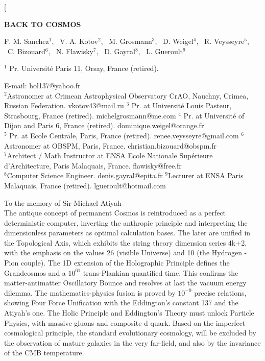 \documentclass[twoside,draft]{article}
\begin{document}
\begin{sloppypar}

\renewcommand{\refname}{References}
\renewcommand{\tablename}{\small Table}
\renewcommand{\figurename}{\small Fig.}
\renewcommand{\contentsname}{Contents}


\twocolumn[%
\begin{center}
\renewcommand{\baselinestretch}{0.93}
{\Large\bfseries BACK TO COSMOS

}\par
\renewcommand{\baselinestretch}{1.0}
\bigskip
F. M. Sanchez$^1\!$, \ V. A. Kotov$^2\!$, \ M. Grosmann$^3$, \ D. Weigel$^4$, \ R. Veysseyre$^5$,\\ \ C. Bizouard$^6$, \ N. Flawisky$^7$, \ D. Gayral$^8$, \ L. Gueroult$^9$\\
{\footnotesize  $^1$ Pr. Universit\'{e} Paris 11, Orsay, France (retired).\rule{0pt}{12pt}
E-mail: hol137@yahoo.fr\\
$^2$Astronomer at Crimean Astrophysical Observatory CrAO, Nauchny, Crimea, Russian Federation. vkotov43@mail.ru
$^3$ Pr. at Universit\'{e} Louis Pasteur, Strasbourg, France (retired). michelgrosmann@me.com
$^4$ Pr. at Universit\'{e} of Dijon and Paris 6, France (retired). dominique.weigel@orange.fr
\\ $^5$ Pr. at Ecole Centrale, Paris, France (retired). renee.veysseyre@gmail.com
$^6$Astronomer at OBSPM, Paris, France. christian.bizouard@obspm.fr
\\ $^7$Architect / Math Instructor at ENSA Ecole Nationale Sup\'{e}rieure d'Architecture, Paris Malaquais, France. flawisky@free.fr
\\$^8$Computer Science Engineer. denis.gayral@epita.fr
$^9$Lecturer at ENSA Paris Malaquais, France (retired). lgueroult@hotmail.com

}\par
\medskip
{\small\parbox{11cm}{%
\hfill To the memory of Sir Michael Atiyah\\
The antique concept of permanent Cosmos is reintroduced as a perfect deterministic computer, inverting the anthropic principle and interpreting the dimensionless parameters as optimal calculation bases. The later are unified in the Topological Axis, which exhibits the string theory dimension series 4k+2, with the emphasis on the values 26 (visible Universe) and 10 (the Hydrogen - Pion couple). The 1D extension of the Holographic Principle defines the Grandcosmos and a $10^{61}$ trans-Plankian quantified time. This confirms the matter-antimatter Oscillatory Bounce and resolves at last the vacuum energy dilemma. The mathematics-physics fusion is proved by $10^{-9}$ precise relations, showing Four Force Unification with the Eddington's constant 137 and the Atiyah's one. The Holic Principle and Eddington's Theory must unlock Particle Physics, with massive gluons and composite d quark.  Based on the imperfect cosmological principle, the standard evolutionary cosmology, will be excluded by the observation of mature galaxies in the very far-field, and also by the invariance of the CMB temperature.  

}}
\end{center}
\end{sloppypar}
\end{document}

